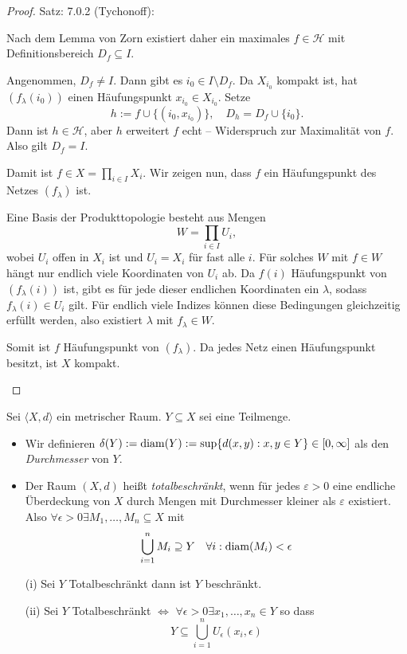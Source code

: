 \begin{proof}{Satz: 7.0.2 (Tychonoff):}
\begin{enumerate}
    Nach dem Lemma von Zorn existiert daher ein maximales $f \in \mathcal{H}$ 
    mit Definitionsbereich $D_f \subseteq I$.

    Angenommen, $D_f \neq I$. 
    Dann gibt es $i_0 \in I \setminus D_f$. 
    Da $X_{i_0}$ kompakt ist, hat $(f_\lambda(i_0))$ einen Häufungspunkt $x_{i_0} \in X_{i_0}$. 
    Setze 
    $$
    h := f \cup \{(i_0, x_{i_0})\}, \quad D_h = D_f \cup \{i_0\}.
    $$
    Dann ist $h \in \mathcal{H}$, aber $h$ erweitert $f$ echt – 
    Widerspruch zur Maximalität von $f$. 
    Also gilt $D_f = I$.

    Damit ist $f \in X = \prod_{i \in I} X_i$. 
    Wir zeigen nun, dass $f$ ein Häufungspunkt des Netzes $(f_\lambda)$ ist.

    Eine Basis der Produkttopologie besteht aus Mengen 
    $$
    W = \prod_{i \in I} U_i, 
    $$
    wobei $U_i$ offen in $X_i$ ist und $U_i = X_i$ für fast alle $i$. 
    Für solches $W$ mit $f \in W$ hängt nur endlich viele Koordinaten von $U_i$ ab. 
    Da $f(i)$ Häufungspunkt von $(f_\lambda(i))$ ist, 
    gibt es für jede dieser endlichen Koordinaten 
    ein $\lambda$, sodass $f_\lambda(i) \in U_i$ gilt. 
    Für endlich viele Indizes können diese Bedingungen gleichzeitig erfüllt werden, 
    also existiert $\lambda$ mit $f_\lambda \in W$.

    Somit ist $f$ Häufungspunkt von $(f_\lambda)$. 
    Da jedes Netz einen Häufungspunkt besitzt, ist $X$ kompakt.
    \end{enumerate}
\end{proof}

{
    Sei $\langle X, d\rangle$ ein metrischer Raum. $Y\subseteq X$ sei eine Teilmenge.
    \begin{itemize}
        \item Wir definieren $\delta(Y):= \operatorname{diam}(Y):= \sup\{ d(x, y) : x, y \in Y \} \in [0, \infty]$
        als den \emph{Durchmesser} von $Y$.
        \item Der Raum $(X, d)$ heißt \emph{totalbeschränkt}, wenn für jedes $\varepsilon > 0$ 
        eine endliche Überdeckung von $X$ durch Mengen mit Durchmesser kleiner als $\varepsilon$ existiert.
        Also $\forall \epsilon >0 \exists M_1,\dots,M_n \subseteq X$ mit 
        $$
        \bigcup_{i=1}^n M_i  \supseteq Y \quad \forall i: \operatorname{diam}(M_i) < \epsilon
        $$
    \end{itemize}
}

\mlenma{}
{
    \begin{itemize}
    \item[(i)] Sei $Y$ Totalbeschränkt dann ist $Y$ beschränkt. 
    \item[(ii)] Sei $Y$ Totalbeschränkt $\Leftrightarrow$ $\forall \epsilon >0 \exists x_1, \ldots, x_n \in Y$
    so dass 
    $$
    Y \subseteq \bigcup_{i=1}^n U_{\epsilon}(x_i, \epsilon)
    $$
    \end{itemize}
}

